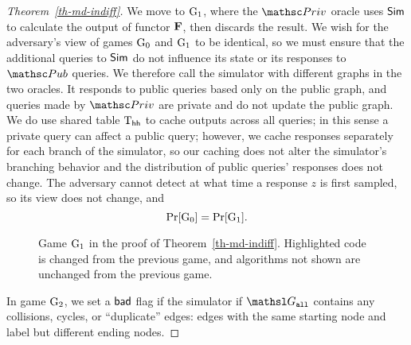 \begin{proof}[Theorem~\ref{th-md-indiff}]
We move to $\textnormal{G}_1$, where the $\PrivO$ oracle uses $\mathsf{Sim}$ to calculate the output
of functor $\mathbf{F}$, then discards the result.
We wish for the adversary's view of games $\textnormal{G}_0$ and $\textnormal{G}_1$ to be identical, so
we must ensure that the additional queries to $\mathsf{Sim}$ do not influence its state
or its responses to $\PubO$ queries.
We therefore call the simulator with different graphs in the two oracles.
It responds to public queries based only on the public graph, and queries made by $\PrivO$ are private and do not update the public graph.
We do use shared table $\text{T}_{\mathsf{hh}}$ to cache outputs across all queries; in this sense a 
private query can affect a public query; however, we cache responses separately for each branch of
the simulator, so our caching does not alter the simulator's branching behavior and the distribution of public queries' responses does not change.
The adversary cannot detect at what time a response $z$ is first sampled, so its
view does not change, and
\[\Pr[\textnormal{G}_0] = \Pr[\textnormal{G}_1].\]
\begin{figure}
	
	\vspace{5pt}
	\caption{Game $\textnormal{G}_1$ in the proof of Theorem~\ref{th-md-indiff}.  Highlighted code is changed from the previous game, and algorithms not shown are unchanged from the previous game.}
	\label{fig-chop-gm1}
\end{figure}
In game $\textnormal{G}_2$, we set a $\mathsf{bad}$ flag if the simulator if $\graph_{\all}$ contains
any collisions, cycles, or ``duplicate'' edges: edges with the same starting node and label but different ending nodes.


\end{proof}
